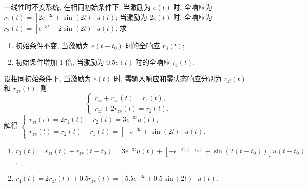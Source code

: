 \begin{exampleprob}
    一线性时不变系统, 在相同初始条件下, 当激励为 $e(t)$ 时, 全响应为 $r_1(t)=[2e^{-3t}+\sin(2t)]u(t)$; 当激励为 $2e(t)$ 时, 全响应为 $r_2(t)=[e^{-3t}+2\sin(2t)]u(t)$. 求
    \begin{enumerate}
        \item 初始条件不变, 当激励为 $e(t-t_0)$ 时的全响应 $r_3(t)$;
        \item 初始条件增加 1 倍, 当激励为 $0.5e(t)$ 时的全响应 $r_4(t)$.
    \end{enumerate}

    \begin{solution}
        设相同初始条件下, 当激励为 $e(t)$ 时, 零输入响应和零状态响应分别为 $r_{zi}(t)$ 和 $r_{zs}(t)$. 则
        \begin{equation*}
            \begin{cases}
                r_{zi}+r_{zs}(t)=r_1(t), \\
                r_{zi}+2r_{zs}(t)=r_2(t).
            \end{cases}
        \end{equation*}
        解得 $\begin{cases}
                r_{zi}(t)=2r_1(t)-r_2(t)=3e^{-3t}u(t), \\
                r_{zs}(t)=r_2(t)-r_1(t)=[-e^{-3t}+\sin(2t)]u(t).
            \end{cases}$

        \begin{enumerate}
            \item $r_3(t)=r_{zi}(t)+r_{zs}(t-t_0)=3e^{-3t}u(t)+[-e^{-3(t-t_0)}+\sin(2(t-t_0))]u(t-t_0)$.
            \item $r_4(t)=2r_{zi}(t)+0.5r_{zs}(t)=[5.5e^{-3t}+0.5\sin(2t)]u(t)$.
        \end{enumerate}
    \end{solution}
\end{exampleprob}

